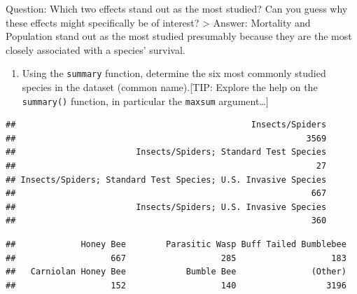 \documentclass[
]{article}
\newenvironment{Shaded}{\begin{snugshade}}{\end{snugshade}}
\newcommand{\AttributeTok}[1]{\textcolor[rgb]{0.13,0.29,0.53}{#1}}
\newcommand{\DecValTok}[1]{\textcolor[rgb]{0.00,0.00,0.81}{#1}}
\newcommand{\FunctionTok}[1]{\textcolor[rgb]{0.13,0.29,0.53}{\textbf{#1}}}
\newcommand{\NormalTok}[1]{#1}
\newcommand{\SpecialCharTok}[1]{\textcolor[rgb]{0.81,0.36,0.00}{\textbf{#1}}}
\providecommand{\tightlist}{%
  \setlength{\itemsep}{0pt}\setlength{\parskip}{0pt}}
\begin{document}
Question: Which two effects stand out as the most studied? Can you guess
why these effects might specifically be of interest? \textgreater{}
Answer: Mortality and Population stand out as the most studied
presumably because they are the most closely associated with a species'
survival.

\begin{enumerate}
\def\labelenumi{\arabic{enumi}.}
\setcounter{enumi}{6}
\tightlist
\item
  Using the \texttt{summary} function, determine the six most commonly
  studied species in the dataset (common name).{[}TIP: Explore the help
  on the \texttt{summary()} function, in particular the \texttt{maxsum}
  argument\ldots{]}
\end{enumerate}

\begin{Shaded}
\end{Shaded}

\begin{verbatim}
##                                               Insects/Spiders 
##                                                          3569 
##                        Insects/Spiders; Standard Test Species 
##                                                            27 
## Insects/Spiders; Standard Test Species; U.S. Invasive Species 
##                                                           667 
##                        Insects/Spiders; U.S. Invasive Species 
##                                                           360
\end{verbatim}

\begin{Shaded}
\end{Shaded}

\begin{verbatim}
##             Honey Bee        Parasitic Wasp Buff Tailed Bumblebee 
##                   667                   285                   183 
##   Carniolan Honey Bee            Bumble Bee               (Other) 
##                   152                   140                  3196
\end{verbatim}
\end{document}
